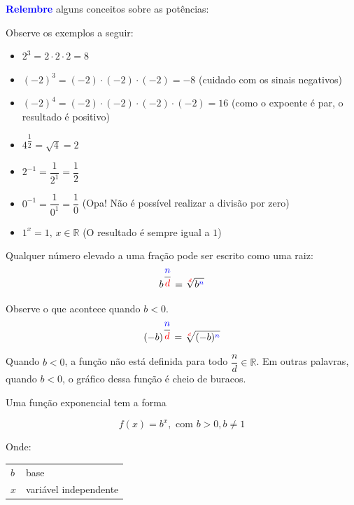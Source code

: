 \documentclass[12pt,openright,twoside,a4paper]{article}
\makeatletter
\theoremstyle{definition}
\newenvironment{condicoes}[1][Onde:]
{#1 \begin{tabular}[t]{>{$}l<{$} @{${} \implies {}$} l}}
	{\end{tabular}\\[\belowdisplayskip]}
\makeatother
\begin{document}
	\begin{snugshade}
		\textbf{\textcolor{blue}{Relembre}} alguns conceitos sobre as potências:
		
		Observe os exemplos a seguir:
		
		
		\begin{itemize}
			\item $2^3 = 2 \cdot 2 \cdot 2 = 8$
			\item $(-2)^3 = (-2) \cdot (-2) \cdot (-2) = -8$ (cuidado com os sinais negativos)
			\item $(-2)^4 = (-2) \cdot (-2) \cdot (-2) \cdot (-2) = 16$ (como o expoente é par, o resultado é positivo)
			\item $4^\dfrac{1}{2} = \sqrt{4} = 2$ 
			\item $\displaystyle 2^{-1} = \dfrac{1}{2^1} = \dfrac{1}{2}$
			\item $\displaystyle 0^{-1} = \dfrac{1}{0^1} = \dfrac{1}{0}$ (Opa! Não é possível realizar a divisão por zero)
			\item $1^x = 1, \, x \in \mathbb{R}$ (O resultado é sempre igual a $1$)
		\end{itemize}
		
		
		Qualquer número elevado a uma fração pode ser escrito como uma raiz:
		\begin{equation*}
			b^{\dfrac{{\textcolor{blue}{n}}}{{\textcolor{red}{d}}}} = \sqrt[{\textcolor{red}{d}}]{b^{\textcolor{blue}{n}}}
		\end{equation*}
		
		Observe o que acontece quando $b<0$.
		\begin{equation*}
			(-b)^{\dfrac{{\textcolor{blue}{n}}}{{\textcolor{red}{d}}}} = \sqrt[{\textcolor{red}{d}}]{(-b)^{\textcolor{blue}{n}}}
		\end{equation*}
		
		Quando $b<0$, a função não está definida para todo $\dfrac{n}{d} \in \mathbb{R}$. Em outras palavras, quando $b<0$, o gráfico dessa função é cheio de buracos.
	\end{snugshade}
	
	Uma função exponencial tem a forma
	
	\begin{equation}
		\boxed{f(x) = b^x, \text{ com } b > 0, b \neq 1} 
	\end{equation}
	
	\begin{condicoes}
		b & base\\
		x & variável independente
	\end{condicoes}
	
\end{document}
